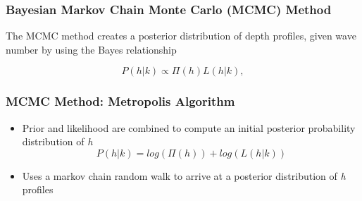 \documentclass[7pt]{beamer}
\begin{document}
 \begin{frame}
\frametitle{Bayesian Markov Chain Monte Carlo (MCMC) Method}
The MCMC method creates a posterior distribution of depth profiles, given wave number by using the Bayes relationship

\begin{equation}\label{bayes}
P(h|%
k) \propto \Pi(h)L(h|%
k),
\end{equation} 
\end{frame}

\begin{frame}
 \frametitle{MCMC Method: Metropolis Algorithm}
\begin{itemize}
\item Prior and likelihood are combined to compute an initial posterior probability distribution of \textit{h}\\
\begin{equation}\label{post}
P(h|%
k) = log(\Pi(h)) + log(L(h|%
k))
\end{equation}
\item Uses a markov chain random walk to %
arrive at a posterior distribution of \textit{h} profiles %
\end{itemize}
\end{frame}
\end{document}
